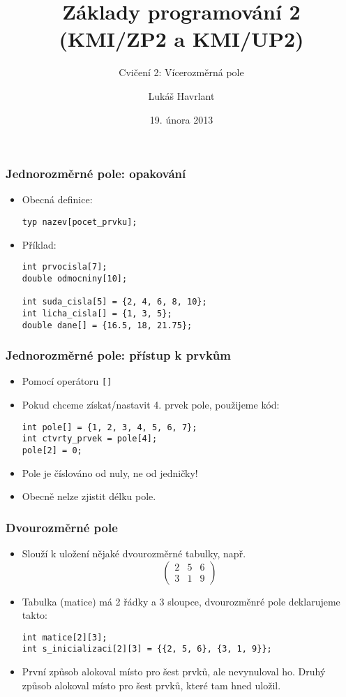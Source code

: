 \documentclass{beamer}
\title{Základy programování 2 (KMI/ZP2 a KMI/UP2)}
\subtitle{Cvičení 2: Vícerozměrná pole}
\author{Lukáš Havrlant}
\date{19. února 2013}
\institute{Univerzita Palackého}
\newenvironment{itemizex}%
  {\large \begin{itemize}%
    \setlength{\itemsep}{8pt}%
    \setlength{\parskip}{8pt}}%
  {\end{itemize}}
\begin{document}
\begin{frame}[t,plain]
\titlepage
\end{frame}


\begin{frame}[t,fragile]\frametitle{Jednorozměrné pole: opakování} 
  \begin{itemizex}
    \item Obecná definice:
    \begin{verbatim} 
typ nazev[pocet_prvku];
    \end{verbatim}
    \item Příklad:
    \begin{verbatim} 
int prvocisla[7];
double odmocniny[10];

int suda_cisla[5] = {2, 4, 6, 8, 10};
int licha_cisla[] = {1, 3, 5};
double dane[] = {16.5, 18, 21.75};
    \end{verbatim}
  \end{itemizex}
\end{frame}



\begin{frame}[t,fragile]\frametitle{Jednorozměrné pole: přístup k prvkům} 
\vskip 0.5cm
\begin{itemizex}
    \item Pomocí operátoru \texttt{[]}
    \item Pokud chceme získat/nastavit 4. prvek pole, použijeme kód:
    \begin{verbatim} 
int pole[] = {1, 2, 3, 4, 5, 6, 7};
int ctvrty_prvek = pole[4];
pole[2] = 0;
    \end{verbatim}
    \item Pole je číslováno od nuly, ne od jedničky!
    \item Obecně nelze zjistit délku pole. 
  \end{itemizex}
\end{frame}


\begin{frame}[t,fragile]\frametitle{Dvourozměrné pole} 
    \begin{itemizex}
        \item Slouží k uložení nějaké dvourozměrné tabulky, např.
$$
\begin{pmatrix}
2&5&6\\
3&1&9
\end{pmatrix}
$$
        \item Tabulka (matice) má 2 řádky a 3 sloupce, dvourozměnré pole deklarujeme takto:
\begin{verbatim} 
int matice[2][3];
int s_inicializaci[2][3] = {{2, 5, 6}, {3, 1, 9}};
\end{verbatim}
        \item První způsob alokoval místo pro šest prvků, ale nevynuloval ho. Druhý způsob alokoval místo pro šest prvků, které tam hned uložil. 
    \end{itemizex}
\end{frame}
\end{document}
